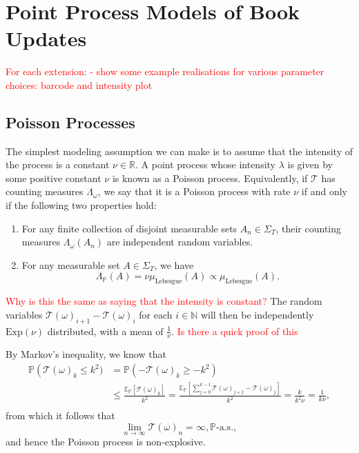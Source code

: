 \documentclass[honours,12pt]{unswthesis}
\numberwithin{equation}{section}
\begin{document}
\section{Point Process Models of Book Updates}

\textcolor{red}{
For each extension:
- show some example realisations for various parameter choices: barcode and intensity plot
}


\subsection{Poisson Processes}
The simplest modeling assumption we can make is to assume that the intensity of the process is a constant $\nu\in\mathbb{R}$. A point process  whose intensity $\lambda$ is given by some positive constant $\nu$ is known as a Poisson process. Equivalently, if $\mathcal{T}$ has counting measures $\Lambda_\omega$, we say that it is a Poisson process with rate $\nu$ if and only if the following two properties hold:
\begin{enumerate}
	\item For any finite collection of disjoint measurable sets $A_n\in\Sigma_T$, their counting measures $\Lambda_\omega(A_n)$ are independent random variables.
	\item For any measurable set $A\in\Sigma_T$, we have $$\Lambda_{\mathbb P}(A) = \nu \mu_{\mathrm{Lebesgue}}(A)\propto\mu_{\mathrm{Lebesgue}}(A).$$
\end{enumerate}
\textcolor{red}{Why is this the same as saying that the intensity is constant?}
The random variables $\mathcal{T}(\omega)_{i+1}-\mathcal{T}(\omega)_i$ for each $i\in\mathbb{N}$ will then be independently $\mathrm{Exp}(\nu)$ distributed, with a mean of $\frac{1}{\nu}$. \textcolor{red}{Is there a quick proof of this}

By Markov's inequality, we know that
\begin{equation*}
	\begin{align}
		\mathbb{P}\left(\mathcal{T}(\omega)_k\leq k^2) &= \mathbb{P}\left(-\mathcal{T}(\omega)_k\geq -k^2\right) \\
		&\leq \frac{\mathbb{E}_\mathbb{P}[\mathcal{T}(\omega)_k]}{k^2} = \frac{\mathbb{E}_\mathbb{P}[\sum_{j=0}^{k-1} \mathcal{T}(\omega)_{j+1}-\mathcal{T}(\omega)_j]}{k^2} = \frac{k}{k^2\nu} = \frac{1}{k\nu}, \\
	\end{align}
\end{equation*}
from which it follows that
$$\lim_{n\to\infty} \mathcal{T}(\omega)_n = \infty, \mathbb{P}\text{-a.s.},$$
and hence the Poisson process is non-explosive.
\end{document}
